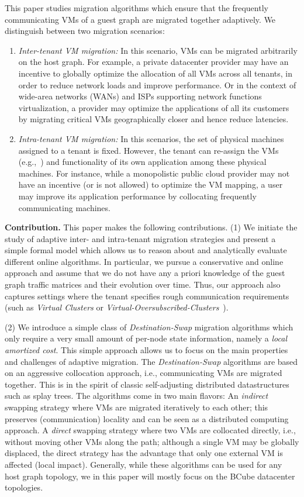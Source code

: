 \documentclass[conference]{IEEEtran}
\begin{document}
This paper studies migration algorithms which ensure that the frequently communicating VMs of a guest graph are migrated
together adaptively. We distinguish between two migration scenarios:
\begin{enumerate}
\item
 \emph{Inter-tenant VM migration:} In this scenario, VMs can be migrated arbitrarily on the host graph. For example,
a private datacenter provider may have an incentive to globally optimize the allocation of all VMs across all tenants, in order
to reduce network loads and improve performance. Or in the context of wide-area networks (WANs) and ISPs
supporting network functions virtualization, a provider may optimize the applications
of all its customers by migrating critical VMs geographically closer and hence reduce latencies.


\item \emph{Intra-tenant VM migration:} In this scenarios, the set of physical machines assigned to a tenant is fixed.
However, the tenant can re-assign the VMs (e.g.,~\cite{intra-tenant}) and functionality of its own application among these physical machines. For instance,
while a monopolistic public cloud provider may not have an incentive (or is not allowed) to optimize the VM mapping,
a user may improve its application performance by collocating frequently communicating machines.
\end{enumerate}

\textbf{Contribution.} This paper makes the following contributions.
\noindent (1) We initiate the study of adaptive inter- and intra-tenant migration strategies and present
a simple formal model which allows us to reason about and analytically evaluate different online algorithms.
In particular, we pursue a conservative and online approach and assume that we do not have any
a priori knowledge of the guest graph traffic matrices and their evolution over time. Thus, our approach also captures
settings where the tenant specifies rough communication requirements (such as \emph{Virtual Clusters} or \emph{Virtual-Oversubscribed-Clusters}~\cite{oktopus}).


\noindent (2) We introduce a simple class of \emph{Destination-Swap} migration algorithms which only require
a very small amount of per-node state information, namely a \emph{local amortized cost}. This simple approach allows us to focus on the main properties and
challenges of adaptive migration. The \emph{Destination-Swap} algorithms are based on an aggressive collocation
approach, i.e., communicating VMs are migrated together. This is in the spirit of classic self-adjusting
distributed datastructures such as splay trees. The algorithms come in two main flavors: An \emph{indirect} swapping
strategy where VMs are migrated iteratively to each other; this preserves (communication) locality and can be seen as a distributed
computing approach. A \emph{direct} swapping strategy where two VMs are collocated directly, i.e., without moving other VMs
along the path; although a single VM may be globally
displaced, the direct strategy has the advantage that only one external VM is affected (local impact).
Generally, while these algorithms can be used for any host graph topology,
we in this paper will mostly focus on the BCube datacenter topologies.
\end{document}
